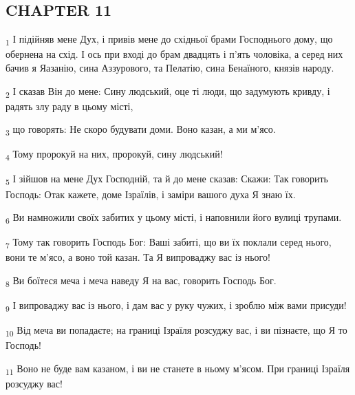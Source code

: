 \subsection{CHAPTER 11}
\begin{tcolorbox}
\textsubscript{1} І підійняв мене Дух, і привів мене до східньої брами Господнього дому, що обернена на схід. І ось при вході до брам двадцять і п'ять чоловіка, а серед них бачив я Яазанію, сина Аззурового, та Пелатію, сина Бенаїного, князів народу.
\end{tcolorbox}
\begin{tcolorbox}
\textsubscript{2} І сказав Він до мене: Сину людський, оце ті люди, що задумують кривду, і радять злу раду в цьому місті,
\end{tcolorbox}
\begin{tcolorbox}
\textsubscript{3} що говорять: Не скоро будувати доми. Воно казан, а ми м'ясо.
\end{tcolorbox}
\begin{tcolorbox}
\textsubscript{4} Тому пророкуй на них, пророкуй, сину людський!
\end{tcolorbox}
\begin{tcolorbox}
\textsubscript{5} І зійшов на мене Дух Господній, та й до мене сказав: Скажи: Так говорить Господь: Отак кажете, доме Ізраїлів, і заміри вашого духа Я знаю їх.
\end{tcolorbox}
\begin{tcolorbox}
\textsubscript{6} Ви намножили своїх забитих у цьому місті, і наповнили його вулиці трупами.
\end{tcolorbox}
\begin{tcolorbox}
\textsubscript{7} Тому так говорить Господь Бог: Ваші забиті, що ви їх поклали серед нього, вони те м'ясо, а воно той казан. Та Я випроваджу вас із нього!
\end{tcolorbox}
\begin{tcolorbox}
\textsubscript{8} Ви боїтеся меча і меча наведу Я на вас, говорить Господь Бог.
\end{tcolorbox}
\begin{tcolorbox}
\textsubscript{9} І випроваджу вас із нього, і дам вас у руку чужих, і зроблю між вами присуди!
\end{tcolorbox}
\begin{tcolorbox}
\textsubscript{10} Від меча ви попадаєте; на границі Ізраїля розсуджу вас, і ви пізнаєте, що Я то Господь!
\end{tcolorbox}
\begin{tcolorbox}
\textsubscript{11} Воно не буде вам казаном, і ви не станете в ньому м'ясом. При границі Ізраїля розсуджу вас!
\end{tcolorbox}
